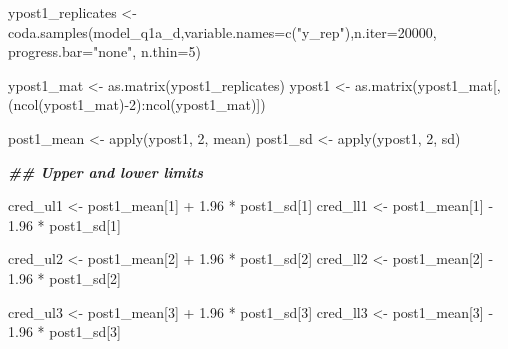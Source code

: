 \documentclass[
]{article}
\newenvironment{Shaded}{\begin{snugshade}}{\end{snugshade}}
\newcommand{\AttributeTok}[1]{\textcolor[rgb]{0.77,0.63,0.00}{#1}}
\newcommand{\DecValTok}[1]{\textcolor[rgb]{0.00,0.00,0.81}{#1}}
\newcommand{\DocumentationTok}[1]{\textcolor[rgb]{0.56,0.35,0.01}{\textbf{\textit{#1}}}}
\newcommand{\FloatTok}[1]{\textcolor[rgb]{0.00,0.00,0.81}{#1}}
\newcommand{\FunctionTok}[1]{\textcolor[rgb]{0.00,0.00,0.00}{#1}}
\newcommand{\NormalTok}[1]{#1}
\newcommand{\OtherTok}[1]{\textcolor[rgb]{0.56,0.35,0.01}{#1}}
\newcommand{\SpecialCharTok}[1]{\textcolor[rgb]{0.00,0.00,0.00}{#1}}
\newcommand{\StringTok}[1]{\textcolor[rgb]{0.31,0.60,0.02}{#1}}
\begin{document}
\begin{Shaded}
\begin{Highlighting}[]
\NormalTok{ypost1\_replicates }\OtherTok{\textless{}{-}} \FunctionTok{coda.samples}\NormalTok{(model\_q1a\_d,}\AttributeTok{variable.names=}\FunctionTok{c}\NormalTok{(}\StringTok{"y\_rep"}\NormalTok{),}\AttributeTok{n.iter=}\DecValTok{20000}\NormalTok{, }\AttributeTok{progress.bar=}\StringTok{"none"}\NormalTok{, }\AttributeTok{n.thin=}\DecValTok{5}\NormalTok{) }

\NormalTok{ypost1\_mat }\OtherTok{\textless{}{-}} \FunctionTok{as.matrix}\NormalTok{(ypost1\_replicates)}
\NormalTok{ypost1 }\OtherTok{\textless{}{-}} \FunctionTok{as.matrix}\NormalTok{(ypost1\_mat[,(}\FunctionTok{ncol}\NormalTok{(ypost1\_mat)}\SpecialCharTok{{-}}\DecValTok{2}\NormalTok{)}\SpecialCharTok{:}\FunctionTok{ncol}\NormalTok{(ypost1\_mat)])}

\NormalTok{post1\_mean }\OtherTok{\textless{}{-}} \FunctionTok{apply}\NormalTok{(ypost1, }\DecValTok{2}\NormalTok{, mean)}
\NormalTok{post1\_sd }\OtherTok{\textless{}{-}} \FunctionTok{apply}\NormalTok{(ypost1, }\DecValTok{2}\NormalTok{, sd)}

\DocumentationTok{\#\# Upper and lower limits}

\NormalTok{cred\_ul1 }\OtherTok{\textless{}{-}}\NormalTok{ post1\_mean[}\DecValTok{1}\NormalTok{] }\SpecialCharTok{+} \FloatTok{1.96} \SpecialCharTok{*}\NormalTok{ post1\_sd[}\DecValTok{1}\NormalTok{]}
\NormalTok{cred\_ll1 }\OtherTok{\textless{}{-}}\NormalTok{ post1\_mean[}\DecValTok{1}\NormalTok{] }\SpecialCharTok{{-}} \FloatTok{1.96} \SpecialCharTok{*}\NormalTok{ post1\_sd[}\DecValTok{1}\NormalTok{]}


\NormalTok{cred\_ul2 }\OtherTok{\textless{}{-}}\NormalTok{ post1\_mean[}\DecValTok{2}\NormalTok{] }\SpecialCharTok{+} \FloatTok{1.96} \SpecialCharTok{*}\NormalTok{ post1\_sd[}\DecValTok{2}\NormalTok{]}
\NormalTok{cred\_ll2 }\OtherTok{\textless{}{-}}\NormalTok{ post1\_mean[}\DecValTok{2}\NormalTok{] }\SpecialCharTok{{-}} \FloatTok{1.96} \SpecialCharTok{*}\NormalTok{ post1\_sd[}\DecValTok{2}\NormalTok{]}


\NormalTok{cred\_ul3 }\OtherTok{\textless{}{-}}\NormalTok{ post1\_mean[}\DecValTok{3}\NormalTok{] }\SpecialCharTok{+} \FloatTok{1.96} \SpecialCharTok{*}\NormalTok{ post1\_sd[}\DecValTok{3}\NormalTok{]}
\NormalTok{cred\_ll3 }\OtherTok{\textless{}{-}}\NormalTok{ post1\_mean[}\DecValTok{3}\NormalTok{] }\SpecialCharTok{{-}} \FloatTok{1.96} \SpecialCharTok{*}\NormalTok{ post1\_sd[}\DecValTok{3}\NormalTok{]}



\end{Highlighting}
\end{Shaded}
\end{document}
